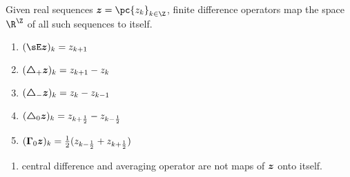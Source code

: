 \documentclass[11pt]{article}
\begin{document}
\begin{definition*}
     Given real sequences $\bz = \pc{z_k}_{k\in\Z}$, finite difference operators map the space $\R^{\Z}$ of all such sequences to itself.
    \begin{enumerate}
        \item {} $(\shift \bz)_k = z_{k+1}$
        \item {} $(\boldsymbol{\bigtriangleup}_+ \bm{z})_k = z_{k+1} - z_k$
        \item {} $(\boldsymbol{\bigtriangleup}_- \bm{z})_k = z_k - z_{k-1}$
        \item {} $(\boldsymbol{\bigtriangleup}_0 \bm{z})_k = z_{k+\frac{1}{2}} - z_{k - \frac{1}{2}}$
        \item {} $(\boldsymbol{\Gamma}_0 \bm{z})_k = \frac{1}{2} (z_{k-\frac{1}{2}} + z_{k+\frac{1}{2}})$
    \end{enumerate}
    \begin{enumerate}
        \item {} central difference and averaging operator are not maps of $\bm{z}$ onto itself.
    \end{enumerate}
\end{definition*}
\end{document}
